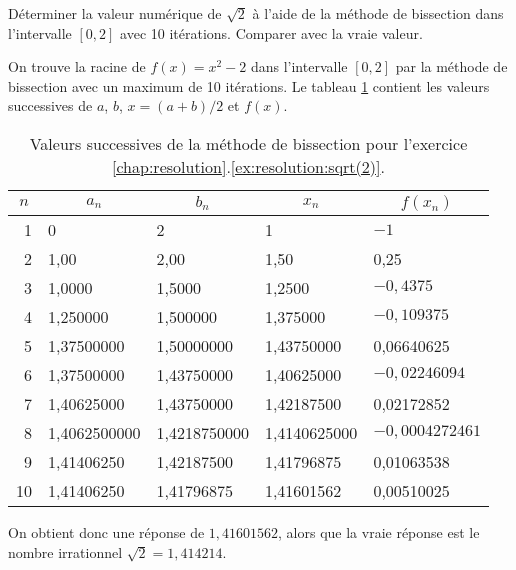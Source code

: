 \begin{exercice}
  \label{ex:resolution:sqrt(2)}
  Déterminer la valeur numérique de $\sqrt{2}$ à l'aide de la méthode
  de bissection dans l'intervalle $[0, 2] $ avec 10 itérations.
  Comparer avec la vraie valeur.
  \begin{sol}
    On trouve la racine de $f(x) = x^2 - 2$ dans l'intervalle $[0, 2]$
    par la méthode de bissection avec un maximum de 10 itérations. Le
    tableau \ref{tab:resolution:sqrt(2)} contient les valeurs
    successives de $a$, $b$, $x = (a + b)/2$ et $f(x)$.
    \begin{table}[t]
      \centering
      \caption{\normalfont Valeurs successives de la méthode de
        bissection pour l'exercice
        \ref{chap:resolution}.\ref{ex:resolution:sqrt(2)}.}
      \label{tab:resolution:sqrt(2)}
      \begin{tabular}{rllll}
        \toprule
        \multicolumn{1}{c}{$n$} &
        \multicolumn{1}{c}{$a_n$} &
        \multicolumn{1}{c}{$b_n$} &
        \multicolumn{1}{c}{$x_n$} &
        \multicolumn{1}{c}{$f(x_n)$} \\
        \midrule
        1 & 0 & 2 & 1 & $-1$ \\
        2 & 1,00 & 2,00 & 1,50 & 0,25 \\
        3 & 1,0000 &  1,5000 &  1,2500 & $-0,4375$ \\
        4 & 1,250000 &  1,500000 &  1,375000 & $-0,109375$ \\
        5 & 1,37500000 & 1,50000000 & 1,43750000 & 0,06640625 \\
        6 & 1,37500000 &  1,43750000 &  1,40625000 & $-0,02246094$ \\
        7 & 1,40625000 & 1,43750000 & 1,42187500 & 0,02172852 \\
        8 & 1,4062500000 &  1,4218750000 &  1,4140625000 & $-0,0004272461$ \\
        9 & 1,41406250 & 1,42187500 & 1,41796875 & 0,01063538 \\
        10 & 1,41406250 & 1,41796875 & 1,41601562 & 0,00510025 \\
        \bottomrule
      \end{tabular}
    \end{table}
    On obtient donc une réponse de $1,41601562$, alors que la vraie
    réponse est le nombre irrationnel $\sqrt{2} = 1,414214$.
  \end{sol}
\end{exercice}

